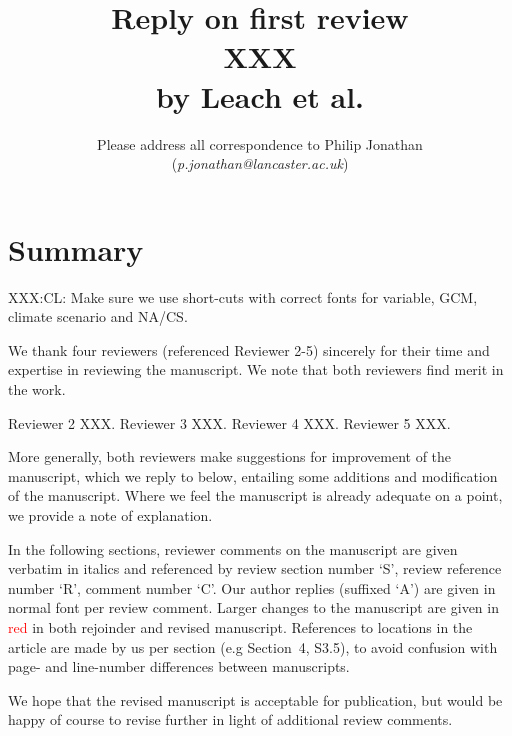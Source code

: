 \documentclass[a4paper,10pt]{article}
\providecommand{\np}{\vspace{10pt}}
\newcommand{\ed}[1]{\textcolor{red}{#1}}
\providecommand{\np}{\vspace{10pt}}
\begin{document}
	
	\title{\textbf{Reply on first review} \np \\ {XXX} \np \\ by Leach et al.}
	\np
	\author{Please address all correspondence to Philip Jonathan (\emph{p.jonathan@lancaster.ac.uk})}
	\date{}
	\maketitle
	
	\section*{Summary}
	
	XXX:CL: Make sure we use short-cuts with correct fonts for variable, GCM, climate scenario and NA/CS.
	
	We thank four reviewers (referenced Reviewer 2-5) sincerely for their time and expertise in reviewing the manuscript. We note that both reviewers find merit in the work. 
	
	Reviewer 2 XXX. Reviewer 3 XXX. Reviewer 4 XXX. Reviewer 5 XXX.
	
	More generally, both reviewers make suggestions for improvement of the manuscript, which we reply to below, entailing some additions and modification of the manuscript. Where we feel the manuscript is already adequate on a point, we provide a note of explanation. 
	
	In the following sections, reviewer comments on the manuscript are given verbatim in italics and referenced by review section number `S', review reference number `R', comment number `C'. Our author replies (suffixed `A') are given in normal font per review comment. Larger changes to the manuscript are given in \ed{red} in both rejoinder and revised manuscript. References to locations in the article are made by us per section (e.g Section~4, S3.5), to avoid confusion with page- and line-number differences between manuscripts. 
	
	We hope that the revised manuscript is acceptable for publication, but would be happy of course to revise further in light of additional review comments.
	
\end{document}
